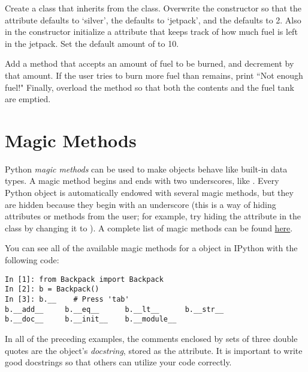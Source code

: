 \begin{problem}
Create a  class that inherits from the  class.
Overwrite the constructor so that the  attribute defaults to `silver', the  defaults to `jetpack', and the  defaults to 2.
Also in the constructor initialize a  attribute that keeps track of how much fuel is left in the jetpack.
Set the default amount of  to 10.

Add a  method that accepts an amount of fuel to be burned, and decrement  by that amount.
If the user tries to burn more fuel than remains, print ``Not enough fuel!"
Finally, overload the  method so that both the contents and the fuel tank are emptied.
\end{problem}

\section*{Magic Methods}

Python \emph{magic methods} can be used to make objects behave like built-in data types.
A magic method begins and ends with two underscores, like .
Every Python object is automatically endowed with several magic methods, but they are hidden because they begin with an underscore (this is a way of hiding attributes or methods from the user; for example, try hiding the  attribute in the  class by changing it to ).
A complete list of magic methods can be found \href{https://docs.python.org/2/reference/datamodel.html#special-method-names}{here}.

You can see all of the available magic methods for a  object in IPython with the following code:

\begin{lstlisting}
In [1]: from Backpack import Backpack
In [2]: b = Backpack()
In [3]: b.__	# Press 'tab'
b.__add__     b.__eq__      b.__lt__      b.__str__     
b.__doc__     b.__init__    b.__module__  
\end{lstlisting}

\begin{info}
In all of the preceding examples, the comments enclosed by sets of three double quotes are the object's \emph{docstring}, stored as the  attribute.
It is important to write good docstrings so that others can utilize your code correctly.
\end{info}

